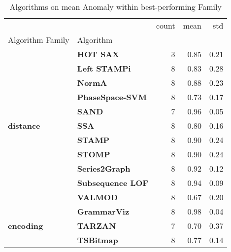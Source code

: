 \begin{table}
\caption{Algorithms on mean Anomaly within best-performing Family}
\label{tab:bp-mean}
\begin{tabular}{llrrr}
\toprule
 &  & count & mean & std \\
Algorithm Family & Algorithm &  &  &  \\
\midrule
\multirow[t]{11}{*}{\textbf{distance}} & \textbf{HOT SAX} & 3 & 0.85 & 0.21 \\
\textbf{} & \textbf{Left STAMPi} & 8 & 0.83 & 0.28 \\
\textbf{} & \textbf{NormA} & 8 & 0.88 & 0.23 \\
\textbf{} & \textbf{PhaseSpace-SVM} & 8 & 0.73 & 0.17 \\
\textbf{} & \textbf{SAND} & 7 & 0.96 & 0.05 \\
\textbf{} & \textbf{SSA} & 8 & 0.80 & 0.16 \\
\textbf{} & \textbf{STAMP} & 8 & 0.90 & 0.24 \\
\textbf{} & \textbf{STOMP} & 8 & 0.90 & 0.24 \\
\textbf{} & \textbf{Series2Graph} & 8 & 0.92 & 0.12 \\
\textbf{} & \textbf{Subsequence LOF} & 8 & 0.94 & 0.09 \\
\textbf{} & \textbf{VALMOD} & 8 & 0.67 & 0.20 \\
\cline{1-5}
\multirow[t]{3}{*}{\textbf{encoding}} & \textbf{GrammarViz} & 8 & 0.98 & 0.04 \\
\textbf{} & \textbf{TARZAN} & 7 & 0.70 & 0.37 \\
\textbf{} & \textbf{TSBitmap} & 8 & 0.77 & 0.14 \\
\cline{1-5}
\bottomrule
\end{tabular}
\end{table}
